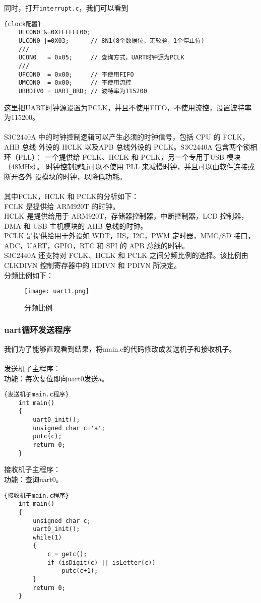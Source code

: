 同时，打开\lstinline{interrupt.c}，我们可以看到
\lstset{language=C}
\begin{lstlisting}{clock配置}
    ULCON0 &=0XFFFFFF00;
    ULCON0 |=0X03;      // 8N1(8个数据位，无较验，1个停止位)
    ///
    UCON0   = 0x05;     // 查询方式，UART时钟源为PCLK
    ///
    UFCON0  = 0x00;     // 不使用FIFO
    UMCON0  = 0x00;     // 不使用流控
    UBRDIV0 = UART_BRD; // 波特率为115200
\end{lstlisting}
这里把UART时钟源设置为PCLK，并且不使用FIFO，不使用流控，设置波特率为115200。\\
\\
S3C2440A 中的时钟控制逻辑可以产生必须的时钟信号，包括 CPU 的 FCLK，AHB 总线
外设的 HCLK 以及APB 总线外设的 PCLK。S3C2440A 包含两个锁相环（PLL）：
一个提供给 FCLK、HCLK 和 PCLK，另一个专用于USB 模块（48MHz）。
时钟控制逻辑可以不使用 PLL 来减慢时钟，并且可以由软件连接或断开各外
设模块的时钟，以降低功耗。\\
\\
其中FCLK，HCLK 和 PCLK的分析如下：\\
FCLK 是提供给 ARM920T 的时钟。\\
HCLK 是提供给用于 ARM920T，存储器控制器，中断控制器，LCD 控制器，DMA 和 USB 主机模块的 AHB
总线的时钟。\\
PCLK 是提供给用于外设如 WDT，IIS，I2C，PWM 定时器，MMC/SD 接口，ADC，UART，GPIO，RTC 和
SPI 的 APB 总线的时钟。\\
S3C2440A 还支持对 FCLK、HCLK 和 PCLK 之间分频比例的选择。该比例由 CLKDIVN 控制寄存器中的 HDIVN
和 PDIVN 所决定。\\
分频比例如下：
\begin{figure}[htbp]
  \centering
  \texttt{[image: uart1.png]}
  \caption{分频比例}
\end{figure}

\subsubsection{uart循环发送程序}
我们为了能够直观看到结果，将main.c的代码修改成发送机子和接收机子。\\
\\
发送机子主程序：\\
功能：每次复位即向uart0发送a。\\
\lstset{language=bash}
\begin{lstlisting}{发送机子main.c程序}
    int main()
    {
        uart0_init(); 
        unsigned char c='a';
        putc(c);
        return 0;
    }
\end{lstlisting}
接收机子主程序：\\
功能：查询uart0。\\
\lstset{language=bash}
\begin{lstlisting}{接收机子main.c程序}
    int main()
    {
        unsigned char c;
        uart0_init(); 
        while(1)
        {
            c = getc();
            if (isDigit(c) || isLetter(c))
                putc(c+1);
        }
        return 0;
    }
\end{lstlisting}


